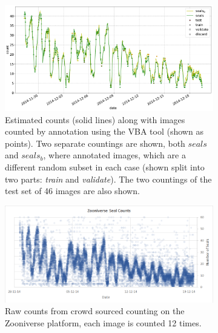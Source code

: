  
\begin{figure}[pht!]
    \centering
    
    \begin{subfigure}[t]{1.0\linewidth}
    \includegraphics[width=1.0\linewidth]{charts/seals/seals_combined.pdf}
    \caption{Estimated counts (solid lines) along with images counted by annotation using the \gls{VBA} tool (shown as points). Two separate countings are shown, both $seals$ and $seals_b$, where annotated images, which are a different random subset in each case (shown split into two parts: \emph{train} and \emph{validate}). The two countings of the test set of 46 images are also shown. }
    \label{fig:turtle_rock}
    \end{subfigure}
    
    
    \begin{subfigure}[t]{1.0\linewidth}
    \includegraphics[width=1.0\linewidth]{figures/annotation/zooniverse.png}
    \caption{Raw counts from crowd sourced counting on the Zooniverse \cite{Zooniverse} platform, each image is counted 12 times. \cite{Eisert2017}}
    \label{fig:zooniverse_counts}
    \end{subfigure}
    
    \caption{}
    \label{fig:seals_timeseries}
\end{figure} 




